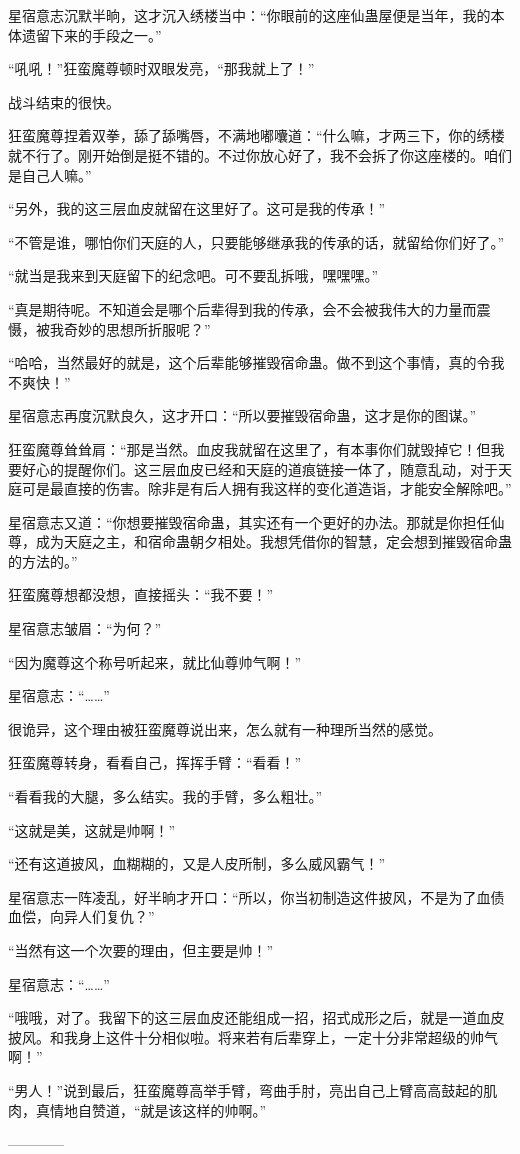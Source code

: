 \begin{this_body}
星宿意志沉默半晌，这才沉入绣楼当中：“你眼前的这座仙蛊屋便是当年，我的本体遗留下来的手段之一。”

“吼吼！”狂蛮魔尊顿时双眼发亮，“那我就上了！”

战斗结束的很快。

狂蛮魔尊捏着双拳，舔了舔嘴唇，不满地嘟囔道：“什么嘛，才两三下，你的绣楼就不行了。刚开始倒是挺不错的。不过你放心好了，我不会拆了你这座楼的。咱们是自己人嘛。”

“另外，我的这三层血皮就留在这里好了。这可是我的传承！”

“不管是谁，哪怕你们天庭的人，只要能够继承我的传承的话，就留给你们好了。”

“就当是我来到天庭留下的纪念吧。可不要乱拆哦，嘿嘿嘿。”

“真是期待呢。不知道会是哪个后辈得到我的传承，会不会被我伟大的力量而震慑，被我奇妙的思想所折服呢？”

“哈哈，当然最好的就是，这个后辈能够摧毁宿命蛊。做不到这个事情，真的令我不爽快！”

星宿意志再度沉默良久，这才开口：“所以要摧毁宿命蛊，这才是你的图谋。”

狂蛮魔尊耸耸肩：“那是当然。血皮我就留在这里了，有本事你们就毁掉它！但我要好心的提醒你们。这三层血皮已经和天庭的道痕链接一体了，随意乱动，对于天庭可是最直接的伤害。除非是有后人拥有我这样的变化道造诣，才能安全解除吧。”

星宿意志又道：“你想要摧毁宿命蛊，其实还有一个更好的办法。那就是你担任仙尊，成为天庭之主，和宿命蛊朝夕相处。我想凭借你的智慧，定会想到摧毁宿命蛊的方法的。”

狂蛮魔尊想都没想，直接摇头：“我不要！”

星宿意志皱眉：“为何？”

“因为魔尊这个称号听起来，就比仙尊帅气啊！”

星宿意志：“……”

很诡异，这个理由被狂蛮魔尊说出来，怎么就有一种理所当然的感觉。

狂蛮魔尊转身，看看自己，挥挥手臂：“看看！”

“看看我的大腿，多么结实。我的手臂，多么粗壮。”

“这就是美，这就是帅啊！”

“还有这道披风，血糊糊的，又是人皮所制，多么威风霸气！”

星宿意志一阵凌乱，好半晌才开口：“所以，你当初制造这件披风，不是为了血债血偿，向异人们复仇？”

“当然有这一个次要的理由，但主要是帅！”

星宿意志：“……”

“哦哦，对了。我留下的这三层血皮还能组成一招，招式成形之后，就是一道血皮披风。和我身上这件十分相似啦。将来若有后辈穿上，一定十分非常超级的帅气啊！”

“男人！”说到最后，狂蛮魔尊高举手臂，弯曲手肘，亮出自己上臂高高鼓起的肌肉，真情地自赞道，“就是该这样的帅啊。”

------------

\end{this_body}

